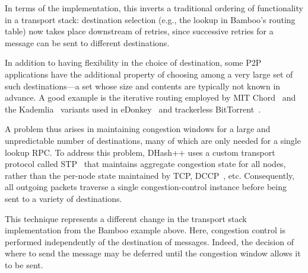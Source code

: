 \documentclass{sig-alt-full}
\renewcommand{\subsection}[1]{\vspace{12pt}\noindent{\bf #1:}}
\begin{document}
In terms of the implementation, this inverts a
traditional ordering of functionality in a transport stack:
destination selection (e.g., the lookup in Bamboo's routing table)
now takes place downstream of retries, since successive
retries for a message can be sent to different destinations. 



\subsection{Next hop flexibility}
\label{sec:unpredictableNextHop}
In addition to having flexibility in the choice of destination, some
P2P applications have the additional property of choosing among a very
large set of such destinations---a set whose size and contents are
typically not known in advance.  A good example
is the iterative routing employed by MIT Chord~\cite{dabek_nsdi04} and the 
Kademlia~\cite{kademlia} variants used in eDonkey~\cite{edonkey} and 
trackerless BitTorrent~\cite{bittorrent-dht}.  

A problem thus arises in maintaining congestion windows for a
large and unpredictable number of destinations, many of which are only
needed for a single lookup RPC.  To address this problem,
DHash++ uses a custom transport protocol called
STP~\cite{dabek_nsdi04} that maintains aggregate congestion state for
all nodes, rather than the per-node state maintained by TCP, 
DCCP~\cite{dccp-problem}, etc. Consequently, all outgoing packets 
traverse a single congestion-control instance before being sent to a variety of
destinations. 

This technique represents a different change in the
transport stack implementation from the Bamboo example above.  Here,
congestion control is performed independently of the destination of
messages.  Indeed, the decision of where to send the message may be
deferred until the congestion window allows it to be sent. 

\end{document}
